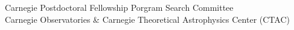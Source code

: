 \documentclass[12pt]{letter}
\begin{document}
\begin{letter}{
               Carnegie Postdoctoral Fellowship Porgram Search Committee \\
               Carnegie Observatories \& Carnegie Theoretical Astrophysics Center (CTAC)
           }


\end{letter}
\end{document}
